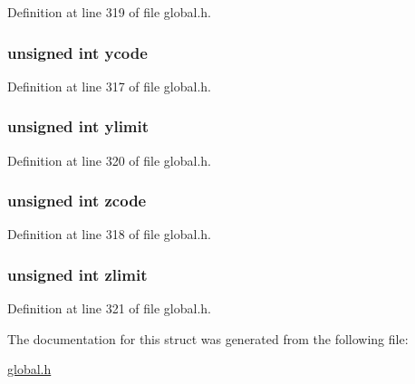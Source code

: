 Definition at line 319 of file global.\-h.

\hypertarget{struct__octNode_a4b6e50c81688bebd12ba2adedbcda9a1}{
\subsubsection[{ycode}]{\setlength{\rightskip}{0pt plus 5cm}unsigned int ycode}}\label{struct__octNode_a4b6e50c81688bebd12ba2adedbcda9a1}


Definition at line 317 of file global.\-h.

\hypertarget{struct__octNode_a9cccedbe80d5a483a64720353228cb2d}{
\subsubsection[{ylimit}]{\setlength{\rightskip}{0pt plus 5cm}unsigned int ylimit}}\label{struct__octNode_a9cccedbe80d5a483a64720353228cb2d}


Definition at line 320 of file global.\-h.

\hypertarget{struct__octNode_ab506fe856c958db3cb3e76607f0f73d3}{
\subsubsection[{zcode}]{\setlength{\rightskip}{0pt plus 5cm}unsigned int zcode}}\label{struct__octNode_ab506fe856c958db3cb3e76607f0f73d3}


Definition at line 318 of file global.\-h.

\hypertarget{struct__octNode_a8a5b654c5671a06aaffd1a8ba23f2be1}{
\subsubsection[{zlimit}]{\setlength{\rightskip}{0pt plus 5cm}unsigned int zlimit}}\label{struct__octNode_a8a5b654c5671a06aaffd1a8ba23f2be1}


Definition at line 321 of file global.\-h.



The documentation for this struct was generated from the following file\-:\begin{DoxyCompactItemize}
\item 
\hyperlink{global_8h}{global.\-h}\end{DoxyCompactItemize}

